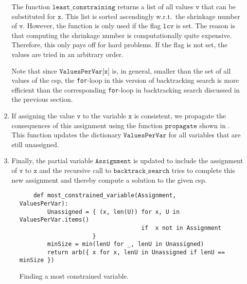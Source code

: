 \begin{enumerate}
      The function $\texttt{least\_constraining}$ returns a list of all values $\texttt{v}$
      that can be substituted for $\texttt{x}$.  This list is sorted ascendingly w.r.t.~the shrinkage number of
      $\texttt{v}$.  However, the function is only used if the flag $\texttt{lcv}$ is set.  The reason is that
      computing the shrinkage number is computationally quite expensive.  Therefore, this only pays off for hard
      problems.  If the flag is not set, the values are tried in an arbitrary order.

      Note that since
      $\texttt{ValuesPerVar[x]}$ is, in general, smaller than the set of all values of the \ac{csp},
      the \texttt{for}-loop in this version of backtracking search is more efficient than the corresponding
      \texttt{for}-loop in backtracking search discussed in the previous section. 
\item If assigning the value $\texttt{v}$ to the variable $\texttt{x}$ is consistent, we propagate the consequences
      of this assignment using the function $\texttt{propagate}$ shown in
      .
      This function updates the dictionary $\mathtt{ValuesPerVar}$ for all variables that are still unassigned.
\item Finally, the partial variable $\texttt{Assignment}$ is updated to include the assignment of 
      $\texttt{v}$ to $\texttt{x}$ and the recursive call to $\texttt{backtrack\_search}$ tries to complete this new
      assignment and thereby compute a solution to the given \ac{csp}. 
\end{enumerate}

\begin{figure}[!ht]
\centering
\begin{verbatim}
    def most_constrained_variable(Assignment, ValuesPerVar):
        Unassigned = { (x, len(U)) for x, U in ValuesPerVar.items()
                                   if  x not in Assignment
                     }
        minSize = min(lenU for _, lenU in Unassigned)
        return arb({ x for x, lenU in Unassigned if lenU == minSize })
\end{verbatim}
\vspace*{-0.3cm}
\caption{Finding a most constrained variable.}
\label{fig:Constraint-Propagation-Solver.ipynb:most_constrained_variable}
\end{figure}

